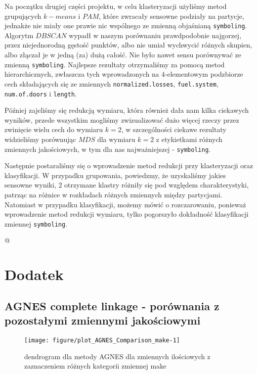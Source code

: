 \documentclass[12pt, a4paper]{article}\usepackage[]{graphicx}\usepackage[]{xcolor}
\makeatletter
\def\maxwidth{ %
  \ifdim\Gin@nat@width>\linewidth
    \linewidth
  \else
    \Gin@nat@width
  \fi
}
\newenvironment{knitrout}{}{} %
\makeatother
\begin{document}
Na początku drugiej części projektu, w celu klasteryzacji użyliśmy metod grupujących $k-means$ i $PAM$, które zwracały sensowne podziały na partycje, jednakże nie miały one prawie nic wspólnego ze zmienną objaśnianą \texttt{symboling}. Algorytm $DBSCAN$ wypadł w naszym porównaniu prawdpodobnie najgorzej, przez niejednorodną gęstość punktów, albo nie umiał wychwycić różnych skupien, albo złączał je w jedną (za) dużą całość. Nie było nawet sensu porównywać ze zmienną \texttt{symboling}. Najlepsze rezultaty otrzymaliśmy za pomocą metod hierarchicznych, zwłaszcza tych wprowadzonych na $4$-elementowym podzbiorze cech składających się ze zmiennych \texttt{normalized.losses}, \texttt{fuel.system}, \texttt{num.of.doors} i \texttt{length}. 
\par Później zajeliśmy się redukcją wymiaru, która również dała nam kilka ciekawych wyników, przede wszystkim mogliśmy zwizualizować dużo więcej rzeczy przez zwinięcie wielu cech do wymiaru $k=2$, w szczególności ciekawe rezultaty widzieliśmy porównując $MDS$ dla wymiaru $k=2$ z etykietkami różnych zmiennych jakościowych, w tym dla nas najważniejszej - \texttt{symboling}. 
\par Następnie postaraliśmy się o wprowadzenie metod redukcji przy klasteryzacji oraz klasyfikacji. W przypadku grupowania, powiedzmy, że uzyskaliśmy jakies sensowne wyniki, $2$ otrzymane klastry różniły się pod względem charakterystyki, patrząc na różnice w rozkładach różnych zmiennych między partycjami. Natomiast w przypadku klasyfikacji, możemy mówić o rozczarowaniu, ponieważ wprowadzenie metod redukcji wymiaru, tylko pogorszyło dokładność klasyfikacji zmiennej \texttt{symboling}.

@
%
\section{Dodatek}

\subsection{AGNES complete linkage - porównania z pozostałymi zmiennymi jakościowymi}
\begin{knitrout}
\color{fgcolor}\begin{figure}[H]

{\centering \texttt{[image: figure/plot\_AGNES\_Comparison\_make-1]} 

}

\caption[dendrogram dla metody AGNES dla zmiennych ilościowych z zaznaczeniem różnych kategorii zmiennej make]{dendrogram dla metody AGNES dla zmiennych ilościowych z zaznaczeniem różnych kategorii zmiennej make}\label{fig:plot_AGNES_Comparison_make}
\end{figure}

\end{knitrout}
\end{document}
